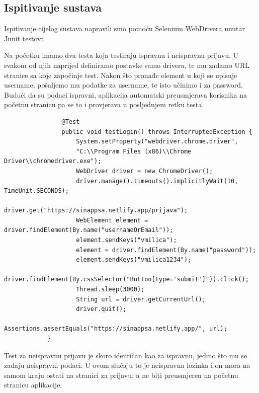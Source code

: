 			\subsection{Ispitivanje sustava}
			
			Ispitivanje cijelog sustava napravili smo pomoću Selenium WebDrivera unutar Junit testova.
			
			\noindent Na početku imamo dva testa koja testiraju ispravnu i neispravnu prijavu. U svakom od njih naprijed definiramo postavke samo drivera, te mu zadamo URL stranice sa koje započinje test. Nakon što pronađe element u koji se upisuje username, pošaljemo mu podatke za username, te isto učinimo i za password. Budući da su podaci ispravni, aplikacija automatski preusmjerava korisnika na početnu stranicu pa se to i provjerava u posljednjem retku testa.
			
			\begin{verbatim}
			    @Test
			    public void testLogin() throws InterruptedException {
			        System.setProperty("webdriver.chrome.driver", 
			        "C:\\Program Files (x86)\\Chrome Driver\\chromedriver.exe");
			        WebDriver driver = new ChromeDriver();
			        driver.manage().timeouts().implicitlyWait(10, TimeUnit.SECONDS);
			        driver.get("https://sinappsa.netlify.app/prijava");
			        WebElement element = driver.findElement(By.name("usernameOrEmail"));
			        element.sendKeys("vmilica");
			        element = driver.findElement(By.name("password"));
			        element.sendKeys("vmilica1234");
			        driver.findElement(By.cssSelector("Button[type='submit']")).click();
			        Thread.sleep(3000);
			        String url = driver.getCurrentUrl();
			        driver.quit();
			        Assertions.assertEquals("https://sinappsa.netlify.app/", url);
		    }
			\end{verbatim}
			Test za neispravnu prijavu je skoro identičan kao za ispravnu, jedino što mu se zadaju neispravni podaci. U ovom slučaju to je neispravna lozinka i on mora na samom kraju ostati na stranici za prijavu, a ne biti preusmjeren na početnu stranicu aplikacije.
			
